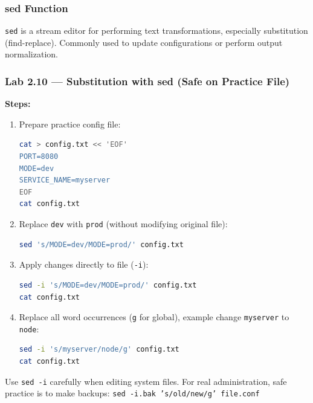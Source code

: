 \subsubsection*{sed Function}
\texttt{sed} is a stream editor for performing text transformations, especially substitution (find-replace).
Commonly used to update configurations or perform output normalization.

\subsubsection*{Lab 2.10 --- Substitution with sed (Safe on Practice File)}
\textbf{Steps:}
\begin{enumerate}
    \item Prepare practice config file:
\begin{lstlisting}[language=bash, caption={Create practice config file}]
cat > config.txt << 'EOF'
PORT=8080
MODE=dev
SERVICE_NAME=myserver
EOF
cat config.txt
\end{lstlisting}

    \item Replace \texttt{dev} with \texttt{prod} (without modifying original file):
\begin{lstlisting}[language=bash, caption={sed substitution without in-place}]
sed 's/MODE=dev/MODE=prod/' config.txt
\end{lstlisting}

    \item Apply changes directly to file (\texttt{-i}):
\begin{lstlisting}[language=bash, caption={sed in-place}]
sed -i 's/MODE=dev/MODE=prod/' config.txt
cat config.txt
\end{lstlisting}

    \item Replace all word occurrences (\texttt{g} for global), example change \texttt{myserver} to \texttt{node}:
\begin{lstlisting}[language=bash, caption={sed global replacement}]
sed -i 's/myserver/node/g' config.txt
cat config.txt
\end{lstlisting}
\end{enumerate}

\begin{warningbox}
Use \texttt{sed -i} carefully when editing system files. For real administration, safe practice is to make backups:
\texttt{sed -i.bak 's/old/new/g' file.conf}
\end{warningbox}

